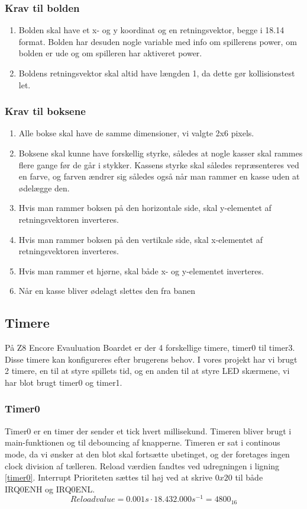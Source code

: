 \subsubsection{Krav til bolden}
\label{Ballkrav}
\begin{enumerate}
\item Bolden skal have et x- og y koordinat og en retningsvektor, begge i 18.14 format. Bolden har desuden nogle variable med info om spillerens power, om bolden er ude og om spilleren har aktiveret power.
\item Boldens retningsvektor skal altid have længden 1, da dette gør kollisionstest let.
\end{enumerate}
\subsubsection{Krav til boksene}
\begin{enumerate}
\item Alle bokse skal have de samme dimensioner, vi valgte 2x6 pixels.
\item Boksene skal kunne have forskellig styrke, således at nogle kasser skal rammes flere gange før de går i stykker. Kassens styrke skal således repræsenteres ved en farve, og farven ændrer sig således også når man rammer en kasse uden at ødelægge den.
\item Hvis man rammer boksen på den horizontale side, skal y-elementet af retningsvektoren inverteres. 
\item Hvis man rammer boksen på den vertikale side, skal x-elementet af retningsvektoren inverteres.
\item Hvis man rammer et hjørne, skal både x- og y-elementet inverteres.
\item Når en kasse bliver ødelagt slettes den fra banen
\end{enumerate}


\subsection{Timere}
På Z8 Encore Evauluation Boardet er der 4 forskellige timere, timer0 til timer3. Disse timere kan konfigureres efter brugerens behov. I vores projekt har vi brugt 2 timere, en til at styre spillets tid, og en anden til at styre LED skærmene, vi har blot brugt timer0 og timer1.
\subsubsection{Timer0}
Timer0 er en timer der sender et tick hvert millisekund. Timeren bliver brugt i main-funktionen og til debouncing af knapperne. Timeren er sat i continous mode, da vi ønsker at den blot skal fortsætte ubetinget, og der foretages ingen clock division af tælleren. Reload værdien fandtes ved udregningen i ligning \ref{timer0}. Interrupt Prioriteten sættes til høj ved at skrive $0x20$ til både IRQ0ENH og IRQ0ENL.
\begin{equation}
\label{timer0}
Reloadvalue = 0.001 \si{s} \cdot 18.432.000 \si{s^{-1}} = 4800_{16} 
\end{equation}
